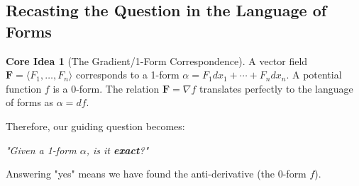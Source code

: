 \documentclass[12pt, letterpaper]{article}
\theoremstyle{definition}
\newtheorem{idea}{Core Idea}[section]
\begin{document}
	\subsection{Recasting the Question in the Language of Forms}
	
	\begin{idea}[The Gradient/1-Form Correspondence]
		A vector field $\mathbf{F} = \langle F_1, \dots, F_n \rangle$ corresponds to a 1-form $\alpha = F_1 dx_1 + \cdots + F_n dx_n$. A potential function $f$ is a 0-form. The relation $\mathbf{F} = \nabla f$ translates perfectly to the language of forms as $\alpha = df$.
	\end{idea}
	
	Therefore, our guiding question becomes:
	\begin{center}
		\textit{"Given a 1-form $\alpha$, is it \textbf{exact}?"}
	\end{center}
	Answering "yes" means we have found the anti-derivative (the 0-form $f$).
	
\end{document}

